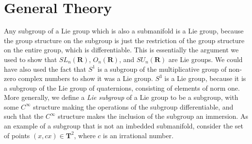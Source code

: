 \section{General Theory}

Any subgroup of a Lie group which is also a submanifold is a Lie group, because the group structure on the subgroup is just the restriction of the group structure on the entire group, which is differentiable. This is essentially the argument we used to show that $SL_n(\mathbf{R})$, $O_n(\mathbf{R})$, and $SU_n(\mathbf{R})$ are Lie groups. We could have also used the fact that $S^1$ is a subgroup of the multiplicative group of non-zero complex numbers to show it was a Lie group. $S^3$ is a Lie group, because it is a subgroup of the Lie group of quaternions, consisting of elements of norm one. More generally, we define a \emph{Lie subgroup} of a Lie group to be a subgroup, with some $C^\infty$ structure making the operations of the subgroup differentiable, and such that the $C^\infty$ structure makes the inclusion of the subgroup an immersion. As an example of a subgroup that is not an imbedded submanifold, consider the set of points $(x,cx) \in \mathbf{T}^2$, where $c$ is an irrational number.

